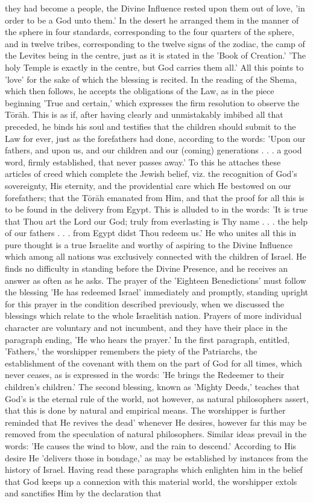 \documentclass[12pt]{article}
\begin{document}
they had become a people, the Divine Influence rested upon them out of love, 'in order to be a God unto them.' In the desert he arranged them in the manner of the sphere in four standards, corresponding to the four quarters of the sphere, and in twelve tribes, corresponding to the twelve signs of the zodiac, the camp of the Levites being in the centre, just as it is stated in the 'Book of Creation.' 'The holy Temple is exactly in the centre, but God carries them all.' All this points to 'love' for the sake of which the blessing is recited. In the reading of the Shema, which then follows, he accepts the obligations of the Law, as in the piece beginning 'True and certain,' which expresses the firm resolution to observe the Tōrāh. This is as if, after having clearly and unmistakably imbibed all that preceded, he binds his soul and testifies that the children should submit to the Law for ever, just as the forefathers had done, according to the words: 'Upon our fathers, and upon us, and our children and our (coming) generations . . . a good word, firmly established, that never passes away.' To this he attaches these articles of creed which complete the Jewish belief, viz. the recognition of God's sovereignty, His eternity, and the providential care which He bestowed on our forefathers; that the Tōrāh emanated from Him, and that the proof for all this is to be found in the delivery from Egypt. This is alluded to in the words: 'It is true that Thou art the Lord our God; truly from everlasting is Thy name . . . the help of our fathers . . . from Egypt didst Thou redeem us.' He who unites all this in pure thought is a true Israelite and worthy of aspiring to the Divine Influence which among all nations was exclusively connected with the children of Israel. He finds no difficulty in standing before the Divine Presence, and he receives an answer as often as he asks. The prayer of the 'Eighteen Benedictions' must follow the blessing 'He has redeemed Israel' immediately and promptly, standing upright for this prayer in the condition described previously, when we discussed the blessings which relate to the whole Israelitish nation. Prayers of more individual character are voluntary and not incumbent, and they have their place in the paragraph ending, 'He who hears the prayer.' In the first paragraph, entitled, 'Fathers,' the worshipper remembers the piety of the Patriarchs, the establishment of the covenant with them on the part of God for all times, which never ceases, as is expressed in the words: 'He brings the Redeemer to their children's children.' The second blessing, known as 'Mighty Deeds,' teaches that God's is the eternal rule of the world, not however, as natural philosophers assert, that this is done by natural and empirical means. The worshipper is further reminded that He revives the dead' whenever He desires, however far this may be removed from the speculation of natural philosophers. Similar ideas prevail in the words: 'He causes the wind to blow, and the rain to descend.' According to His desire He 'delivers those in bondage,' as may be established by instances from the history of Israel. Having read these paragraphs which enlighten him in the belief that God keeps up a connexion with this material world, the worshipper extols and sanctifies Him by the declaration that 
\end{document}
